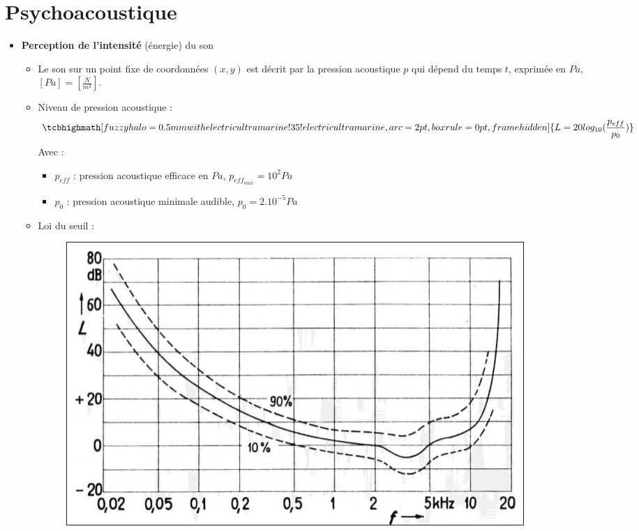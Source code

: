 \section{Psychoacoustique}
\begin{itemize}
    \item \textbf{Perception de l'intensité} (énergie) du son \newline
        \begin{itemize}
            \item Le son sur un point fixe de coordonnées $(x,y)$ est décrit par la pression acoustique $p$ qui dépend du temps $t$, exprimée en $Pa$, $[Pa]=[\frac{N}{m^{2}}]$.
            \item Niveau de pression acoustique : 
            \begin{equation}
                \normalsize
                \tcbhighmath[fuzzy halo=0.5mm with electricultramarine!35!electricultramarine,arc=2pt,
                boxrule=0pt,frame hidden]{ 
                    L = 20log_{10}(\frac{p_{eff}}{p_{0}})
                } \nonumber
                \normalsize
            \end{equation}
            Avec : 
            \begin{itemize}
                \item $p_{eff}$ : pression acoustique efficace en $Pa$, $p_{eff_{max}} = 10^{2} Pa$
                \item $p_{0}$ : pression acoustique minimale audible, $p_{0} = 2.10^{-5} Pa$
            \end{itemize}
            \item Loi du seuil :
            \begin{figure}[hbt!]
                \centering
                \includegraphics[scale=0.3]{Pics/Loi_du_Seuil.png}

\end{figure}
\end{itemize}
\end{itemize}
